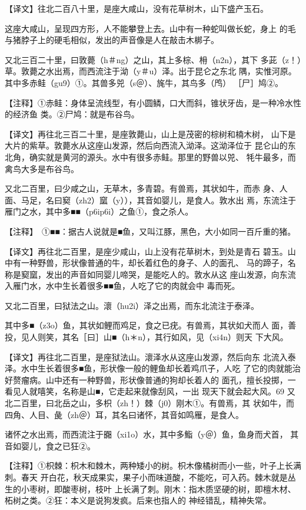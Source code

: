 \documentclass[a4paper,12pt,UTF8,twoside]{ctexbook}
\begin{document}
【译文】往北二百八十里，是座大咸山，没有花草树木，山下盛产玉石。

这座大咸山，呈现四方形，人不能攀登上去。山中有一种蛇叫做长蛇，身上 的毛与猪脖子上的硬毛相似，发出的声音像是人在敲击木梆子。

又北三百二十里，曰敦薨（h＃ng）之山，其上多棕、枏（n2n），其下 多茈（z！）草。敦薨之水出焉，而西流注于泑（y＃u）泽。出于昆仑之东北 隅，实惟河原。其中多赤鲑（gu9）①。其兽多兕（s＠）、旄牛，其鸟多（鸤） ［尸］鸠②。

【注释】①赤鲑：身体呈流线型，有小圆鳞，口大而斜，锥状牙齿，是一种冷水性的经济鱼 类。②尸鸠：就是布谷鸟。

【译文】再往北三百二十里，是座敦薨山，山上是茂密的棕树和楠木树， 山下是大片的紫草。敦薨水从这座山发源，然后向西流入泑泽。这泑泽位于 昆仑山的东北角，确实就是黄河的源头。水中有很多赤鲑。那里的野兽以兕、 牦牛最多，而禽鸟大多是布谷鸟。

又北二百里，曰少咸之山，无草木，多青碧。有兽焉，其状如牛，而赤 身、人面、马足，名曰窫（zh2）窳（y）），其音如婴儿，是食人。敦水出 焉，东流注于雁门之水，其中多■■（p6ip6i）之鱼①，食之杀人。

【注释】　①■■：据古人说就是■鱼，又叫江豚，黑色，大小如同一百斤重的猪。

【译文】再往北二百里，是座少咸山，山上没有花草树木，到处是青石 碧玉。山中有一种野兽，形状像普通的牛，却长着红色的身子、人的面孔、 马的蹄子，名称是窫窳，发出的声音如同婴儿啼哭，是能吃人的。敦水从这 座山发源，向东流入雁门水，水中生长着很多■■鱼，人吃了它的肉就会中 毒而死。

又北二百里，曰狱法之山。瀤（hu2i）泽之出焉，而东北流注于泰泽。

其中多■（z3o）鱼，其状如鲤而鸡足，食之已疣。有兽焉，其状如犬而人 面，善投，见人则笑，其名［曰］山■（h＊n），其行如风，见（xi4n）则天 下大风。

【译文】再往北二百里，是座狱法山。瀤泽水从这座山发源，然后向东 北流入泰泽。水中生长着很多■鱼，形状像一般的鲤鱼却长着鸡爪子，人吃 了它的肉就能治好赘瘤病。山中还有一种野兽，形状像普通的狗却长着人的 面孔，擅长投掷，一看见人就嘻笑，名称是山■，它走起来就像刮风，一出 现天下就会起大风。69 又北二百里，曰北岳之山，多枳（zh！）棘（j0）刚木①。有兽焉，其 状如牛，而四角、人目、彘（zh＠）耳，其名曰诸怀，其音如鸣雁，是食人。

诸怀之水出焉，而西流注于嚻（xi1o）水，其中多鮨（y＠）鱼，鱼身而犬首， 其音如婴儿，食之已狂②。

【注释】①枳棘：枳木和棘木，两种矮小的树。枳木像橘树而小一些，叶子上长满刺。春天 开白花，秋天成果实，果子小而味道酸，不能吃，可入药。棘木就是丛生的小枣树，即酸枣树，枝叶 上长满了刺。刚木：指木质坚硬的树，即檀木材、柘树之类。②狂：本义是说狗发疯。后来也指人的 神经错乱，精神失常。
\end{document}
